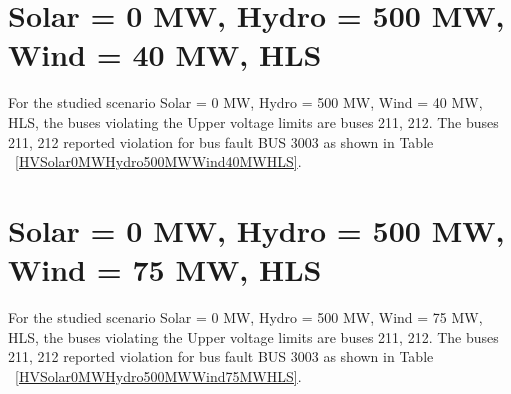 \documentclass[10pt]{report}
\begin{document}
\section{Solar = 0 MW, Hydro = 500 MW, Wind = 40 MW, HLS}
For the studied scenario Solar = 0 MW, Hydro = 500 MW, Wind = 40 MW, HLS, the buses violating the Upper voltage limits are buses 211, 212.
The buses 211, 212 reported violation for bus fault BUS 3003 as shown in Table ~\ref{HVSolar0MWHydro500MWWind40MWHLS}.
\begin{table}[H]
\caption{Contingencies reporting bus voltages greater than emergency voltage of 1.1 PU for scenario Solar = 0 MW, Hydro = 500 MW, Wind = 40 MW, HLS}
\label{HVSolar0MWHydro500MWWind40MWHLS}
\centering
{}
\end{table}


\section{Solar = 0 MW, Hydro = 500 MW, Wind = 75 MW, HLS}
For the studied scenario Solar = 0 MW, Hydro = 500 MW, Wind = 75 MW, HLS, the buses violating the Upper voltage limits are buses 211, 212.
The buses 211, 212 reported violation for bus fault BUS 3003 as shown in Table ~\ref{HVSolar0MWHydro500MWWind75MWHLS}.
\begin{table}[H]
\caption{Contingencies reporting bus voltages greater than emergency voltage of 1.1 PU for scenario Solar = 0 MW, Hydro = 500 MW, Wind = 75 MW, HLS}
\label{HVSolar0MWHydro500MWWind75MWHLS}
\centering
{}
\end{table}
\end{document}
